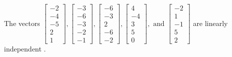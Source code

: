 \begin{exercise}
\begin{exerciseStatement}
  \end{exerciseStatement}
  \begin{exerciseAnswer}
   The vectors \(\left[\begin{array}{r}
-2 \\
-4 \\
-5 \\
2 \\
1
\end{array}\right] , \left[\begin{array}{r}
-3 \\
-6 \\
-3 \\
-2 \\
-1
\end{array}\right] , \left[\begin{array}{r}
-6 \\
-3 \\
2 \\
-6 \\
-2
\end{array}\right] , \left[\begin{array}{r}
4 \\
-4 \\
3 \\
5 \\
0
\end{array}\right] , \text{ and } \left[\begin{array}{r}
-2 \\
1 \\
-1 \\
5 \\
2
\end{array}\right]\) are 
  	 linearly independent  .
  


  \end{exerciseAnswer}
\end{exercise}